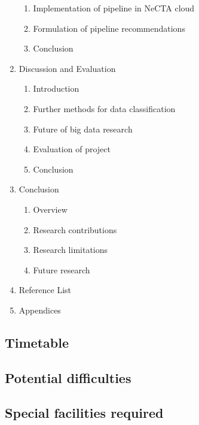 \documentclass[a4paper,11pt]{article}
\begin{document}
\begin{enumerate}
\begin{enumerate}[label*=\arabic*.]
    \item Implementation of pipeline in NeCTA cloud
    \item Formulation of pipeline recommendations
    \item Conclusion
  \end{enumerate}
  \item Discussion and Evaluation
  \begin{enumerate}[label*=\arabic*.]
    \item Introduction
    \item Further methods for data classification
    \item Future of big data research
    \item Evaluation of project
    \item Conclusion
  \end{enumerate}
  \item Conclusion
  \begin{enumerate}[label*=\arabic*.]
    \item Overview
    \item Research contributions
    \item Research limitations
    \item Future research
  \end{enumerate}
  \item Reference List
  \item Appendices
\end{enumerate}


\subsection{Timetable} %
\label{sub:timetable}


\subsection{Potential difficulties} %
\label{sub:potential_difficulties}


\subsection{Special facilities required} %
\label{sub:special_facilities_required}
\end{document}
